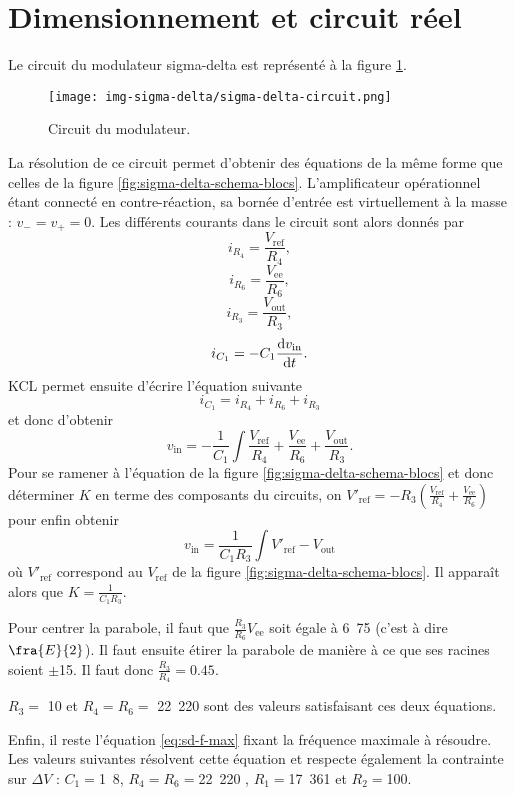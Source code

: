 \section{Dimensionnement et circuit réel}
Le circuit du modulateur sigma-delta est représenté
à la figure \ref{fig:sigma-delta-circuit}.

\begin{figure}[ht]
	\centering
	\texttt{[image: img-sigma-delta/sigma-delta-circuit.png]}
	\caption{Circuit du modulateur.}
	\label{fig:sigma-delta-circuit}
\end{figure}

La résolution de ce circuit permet d'obtenir des équations
de la même forme que celles de la figure
\ref{fig:sigma-delta-schema-blocs}.
L'amplificateur opérationnel étant connecté en contre-réaction,
sa bornée d'entrée est virtuellement à la masse : $v_- = v_+ = 0$.
Les différents courants dans le circuit sont alors donnés par
\[ i_{R_4} = \frac{V_{\text{ref}}}{R_4},\]
\[ i_{R_6} = \frac{V_{\text{ee}}}{R_6},\]
\[ i_{R_3} = \frac{V_{\text{out}}}{R_3},\]
\[ i_{C_1} = -C_1\frac{\operatorname{d}\! v_{\text{in}}}{\operatorname{d}\! t}.\]
KCL permet ensuite d'écrire l'équation suivante
\[ i_{C_1} = i_{R_4} + i_{R_6} + i_{R_3}\]
et donc d'obtenir
\[ v_{\text{in}} = -\frac{1}{C_1}\int \frac{V_{\text{ref}}}{R_4}
+ \frac{V_{\text{ee}}}{R_6} + \frac{V_{\text{out}}}{R_3}.\]
Pour se ramener à l'équation de la figure
\ref{fig:sigma-delta-schema-blocs} et donc déterminer $K$
en terme des composants du circuits, on
$V'_{\text{ref}} = -R_3(\frac{V_{\text{ref}}}{R_4}+\frac{V_{\text{ee}}}{R_6})$
pour enfin obtenir
\[ v_{\text{in}} = \frac{1}{C_1R_3} \int V'_{\text{ref}} - V_{\text{out}}\]
où $V'_{\text{ref}}$ correspond au $V_{\text{ref}}$
de la figure \ref{fig:sigma-delta-schema-blocs}. Il apparaît alors
que $K = \frac{1}{C_1R_3}$.

Pour centrer la parabole, il faut que $\frac{R_3}{R_6}V_{\text{ee}}$
soit égale à \unit{6.75}{\volt} (c'est à dire $\fra{E}{2}$). Il faut ensuite
étirer la parabole de manière à ce que ses racines soient $\pm$\unit{15}{\volt}.
Il faut donc $\frac{R_3}{R_4} = 0.45$. 

$R_3 =$ \unit{10}{\kilo\ohm} et $R_4 = R_6 =$ \unit{22.220}{\kilo\ohm} sont des valeurs
satisfaisant ces deux équations.

Enfin, il reste l'équation \ref{eq:sd-f-max} fixant la fréquence maximale à résoudre.
Les valeurs suivantes résolvent cette équation et respecte également la contrainte
sur $\Delta V$ : $C_1 = $\unit{1.8}{\nano\farad}, $R_4 = R_6 = $\unit{22.220}{\kilo\ohm}
, $R_1 = $\unit{17.361}{\kilo\ohm} et $R_2 = $\unit{100}{\kilo\ohm}. 

